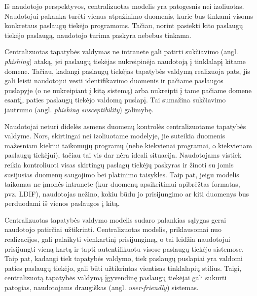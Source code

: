  
Iš naudotojo perspektyvos, centralizuotas modelis yra patogesnis nei izoliuotas. Naudotojui pakanka turėti vienus atpažinimo duomenis,
kurie bus tinkami visoms konkretaus paslaugų tiekėjo programoms. Tačiau, norint pasiekti kito paslaugų tiekėjo paslaugą,
naudotojo turima paskyra nebebus tinkama.

Centralizuotas tapatybės valdymas ne intranete gali patirti sukčiavimo (angl. \textit{phishing}) ataką, jei paslaugų tiekėjas nukreipinėja naudotoją į tinklalapį kitame domene. Tačiau,
kadangi paslaugų tiekėjas tapatybės valdymą realizuoja pats, jis gali leisti naudotojui vesti identifikavimo duomenis ir pačiame paslaugos puslapyje (o ne nukreipiant
į kitą sistemą) arba nukreipti į tame pačiame domene esantį, paties paslaugų tiekėjo valdomą puslapį. Tai sumažina sukčiavimo jautrumo (angl. \textit{phishing susceptibility}) galimybę.

Naudotojai neturi didelės asmens duomenų kontrolės centralizuotame tapatybės valdyme. Nors, skirtingai nei izoliuotame modelyje, jie suteikia duomenis mažesniam kiekiui taikomųjų programų
(nebe kiekvienai programai, o kiekvienam paslaugų tiekėjui), tačiau tai vis dar nėra ideali situacija. Naudotojams vistiek reikia kontroliuoti
visas skirtingų paslagų tiekėjų paskyras ir žinoti su jomis susijusias duomenų saugojimo bei platinimo taisykles. Taip pat, jeigu modelis taikomas ne įmonės intranete (kur
duomenų apsikeitimui apibrėžtas formatas, pvz. LDIF), naudotojas nežino, kokiu būdu jo prisijungimo ar kiti duomenys bus perduodami iš vienos paslaugos į kitą.

Centralizuotas tapatybės valdymo modelis sudaro palankias sąlygas gerai naudotojo patirčiai užtikrinti. Centralizuotas modelis, priklausomai nuo realizacijos,
gali palaikyti vienkartinį prisijungimą, o tai leidžia naudotojui prisijungti vieną kartą ir tapti autentifikuotu visose paslaugų tiekėjo sistemose. Taip pat, kadangi
tiek tapatybės valdymo, tiek paslaugų puslapiai yra valdomi paties paslaugų tiekėjo, gali būti užtikrintas vientisas tinklalapių stilius. Taigi, centralizuotą tapatybės valdymą
įgyvendinę paslaugų tiekėjai gali sukurti patogias, naudotojams draugiškas (angl. \textit{user-friendly}) sistemas.



